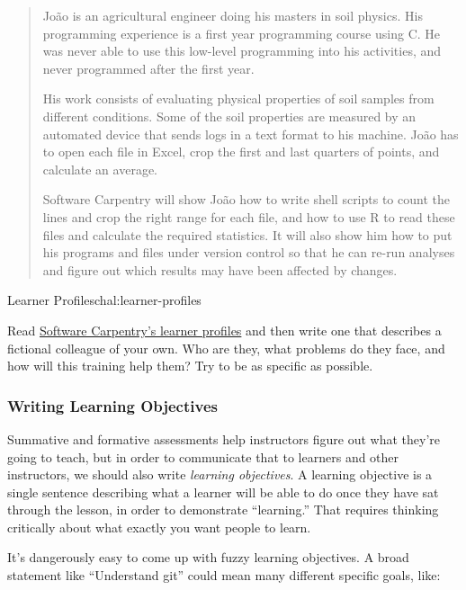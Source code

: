 \begin{quote}
João is an agricultural engineer doing his masters in soil physics. His
programming experience is a first year programming course using C. He
was never able to use this low-level programming into his activities,
and never programmed after the first year.

His work consists of evaluating physical properties of soil samples from
different conditions. Some of the soil properties are measured by an
automated device that sends logs in a text format to his machine. João
has to open each file in Excel, crop the first and last quarters of
points, and calculate an average.

Software Carpentry will show João how to write shell scripts to count
the lines and crop the right range for each file, and how to use R to
read these files and calculate the required statistics. It will also
show him how to put his programs and files under version control so that
he can re-run analyses and figure out which results may have been
affected by changes.
\end{quote}

\begin{challenge}{Learner Profiles}{chal:learner-profiles}

Read \href{http://software-carpentry.org/audience/}{Software Carpentry's
learner profiles} and then write one that describes a fictional
colleague of your own. Who are they, what problems do they face, and how
will this training help them? Try to be as specific as possible.
\end{challenge}

\subsubsection{Writing Learning
Objectives}\label{writing-learning-objectives}

Summative and formative assessments help instructors figure out what
they're going to teach, but in order to communicate that to learners and
other instructors, we should also write \emph{learning objectives}. A
learning objective is a single sentence describing what a learner will
be able to do once they have sat through the lesson, in order to
demonstrate ``learning.'' That requires thinking critically about what
exactly you want people to learn.

It's dangerously easy to come up with fuzzy learning objectives. A broad
statement like ``Understand git'' could mean many different specific
goals, like:

